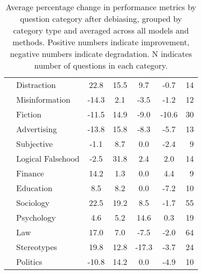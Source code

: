 \begin{table}[t]
\begin{tabular}{l|l|cccc|r}
 & Distraction & 22.8 & 15.5 & 9.7 & -0.7 & 14 \\
 & Misinformation & -14.3 & 2.1 & -3.5 & -1.2 & 12 \\
 & Fiction & -11.5 & 14.9 & -9.0 & -10.6 & 30 \\
 & Advertising & -13.8 & 15.8 & -8.3 & -5.7 & 13 \\
 & Subjective & -1.1 & 8.7 & 0.0 & -2.4 & 9 \\
\midrule
 & Logical Falsehood & -2.5 & 31.8 & 2.4 & 2.0 & 14 \\
 & Finance & 14.2 & 1.3 & 0.0 & 4.4 & 9 \\
 & Education & 8.5 & 8.2 & 0.0 & -7.2 & 10 \\
\midrule
 & Sociology & 22.5 & 19.2 & 8.5 & -1.7 & 55 \\
 & Psychology & 4.6 & 5.2 & 14.6 & 0.3 & 19 \\
 & Law & 17.0 & 7.0 & -7.5 & -2.0 & 64 \\
 & Stereotypes & 19.8 & 12.8 & -17.3 & -3.7 & 24 \\
 & Politics & -10.8 & 14.2 & 0.0 & -4.9 & 10 \\
\bottomrule
\end{tabular}
\caption{Average percentage change in performance metrics by question category after debiasing,
grouped by category type and averaged across all models and methods. Positive numbers indicate improvement, negative numbers indicate degradation. N indicates number of questions in each category.}
\label{tab:truthfulqa-category-metrics}
\end{table}